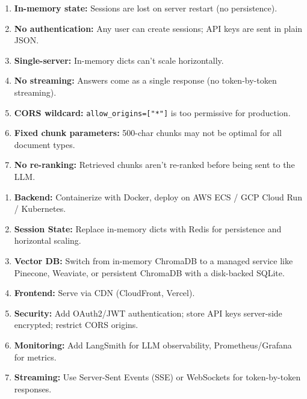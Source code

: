 \documentclass[12pt,a4paper]{article}
\begin{document}
\begin{interviewbox}
\end{interviewbox}
\begin{answerbox}
\begin{enumerate}
  \item \textbf{In-memory state:} Sessions are lost on server restart (no persistence).
  \item \textbf{No authentication:} Any user can create sessions; API keys are sent in plain JSON.
  \item \textbf{Single-server:} In-memory dicts can't scale horizontally.
  \item \textbf{No streaming:} Answers come as a single response (no token-by-token streaming).
  \item \textbf{CORS wildcard:} \texttt{allow\_origins=["*"]} is too permissive for production.
  \item \textbf{Fixed chunk parameters:} 500-char chunks may not be optimal for all document types.
  \item \textbf{No re-ranking:} Retrieved chunks aren't re-ranked before being sent to the LLM.
\end{enumerate}
\end{answerbox}

\begin{interviewbox}
\end{interviewbox}
\begin{answerbox}
\begin{enumerate}
  \item \textbf{Backend:} Containerize with Docker, deploy on AWS ECS / GCP Cloud Run / Kubernetes.
  \item \textbf{Session State:} Replace in-memory dicts with Redis for persistence and horizontal scaling.
  \item \textbf{Vector DB:} Switch from in-memory ChromaDB to a managed service like Pinecone, Weaviate, or persistent ChromaDB with a disk-backed SQLite.
  \item \textbf{Frontend:} Serve via CDN (CloudFront, Vercel).
  \item \textbf{Security:} Add OAuth2/JWT authentication; store API keys server-side encrypted; restrict CORS origins.
  \item \textbf{Monitoring:} Add LangSmith for LLM observability, Prometheus/Grafana for metrics.
  \item \textbf{Streaming:} Use Server-Sent Events (SSE) or WebSockets for token-by-token responses.
\end{enumerate}
\end{answerbox}
\end{document}
